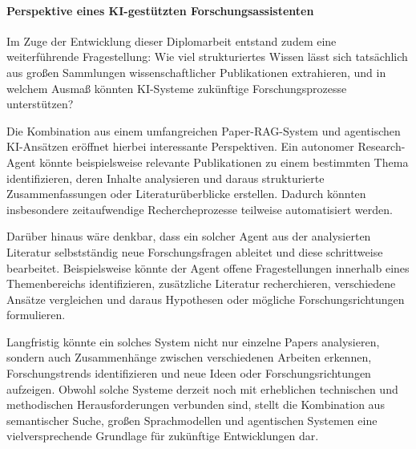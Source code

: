 \paragraph{Perspektive eines KI-gestützten Forschungsassistenten}
Im Zuge der Entwicklung dieser Diplomarbeit entstand zudem eine weiterführende Fragestellung: Wie viel strukturiertes Wissen lässt sich tatsächlich aus großen Sammlungen wissenschaftlicher Publikationen extrahieren, und in welchem Ausmaß könnten KI-Systeme zukünftige Forschungsprozesse unterstützen?

Die Kombination aus einem umfangreichen Paper-RAG-System und agentischen KI-Ansätzen eröffnet hierbei interessante Perspektiven. Ein autonomer Research-Agent könnte beispielsweise relevante Publikationen zu einem bestimmten Thema identifizieren, deren Inhalte analysieren und daraus strukturierte Zusammenfassungen oder Literaturüberblicke erstellen. Dadurch könnten insbesondere zeitaufwendige Rechercheprozesse teilweise automatisiert werden.

Darüber hinaus wäre denkbar, dass ein solcher Agent aus der analysierten Literatur selbstständig neue Forschungsfragen ableitet und diese schrittweise bearbeitet. Beispielsweise könnte der Agent offene Fragestellungen innerhalb eines Themenbereichs identifizieren, zusätzliche Literatur recherchieren, verschiedene Ansätze vergleichen und daraus Hypothesen oder mögliche Forschungsrichtungen formulieren.

Langfristig könnte ein solches System nicht nur einzelne Papers analysieren, sondern auch Zusammenhänge zwischen verschiedenen Arbeiten erkennen, Forschungstrends identifizieren und neue Ideen oder Forschungsrichtungen aufzeigen. Obwohl solche Systeme derzeit noch mit erheblichen technischen und methodischen Herausforderungen verbunden sind, stellt die Kombination aus semantischer Suche, großen Sprachmodellen und agentischen Systemen eine vielversprechende Grundlage für zukünftige Entwicklungen dar.
